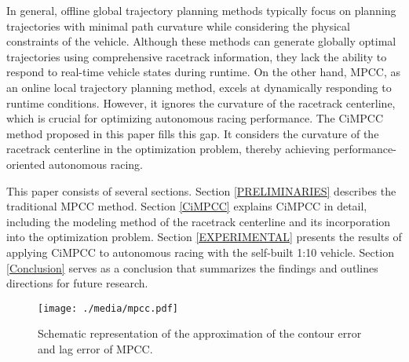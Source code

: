 In general, offline global trajectory planning methods typically focus on planning trajectories with minimal path curvature while considering the physical constraints of the vehicle. Although these methods can generate globally optimal trajectories using comprehensive racetrack information, they lack the ability to respond to real-time vehicle states during runtime. On the other hand, MPCC, as an online local trajectory planning method, excels at dynamically responding to runtime conditions. However, it ignores the curvature of the racetrack centerline, which is crucial for optimizing autonomous racing performance. The CiMPCC method proposed in this paper fills this gap. It considers the curvature of the racetrack centerline in the optimization problem, thereby achieving performance-oriented autonomous racing.


This paper consists of several sections. Section \ref{PRELIMINARIES} describes the traditional MPCC method. Section \ref{CiMPCC} explains CiMPCC in detail, including the modeling method of the racetrack centerline and its incorporation into the optimization problem. Section \ref{EXPERIMENTAL}  presents the results of applying CiMPCC to autonomous racing with the self-built 1:10 vehicle. Section \ref{Conclusion} serves as a conclusion that summarizes the findings and outlines directions for future research.

\begin{figure}[!t]
	\centering
	\texttt{[image: ./media/mpcc.pdf]}
	\caption{Schematic representation of the approximation of the contour error and lag error of MPCC.}
	\label{fig:mpcc}
\end{figure}